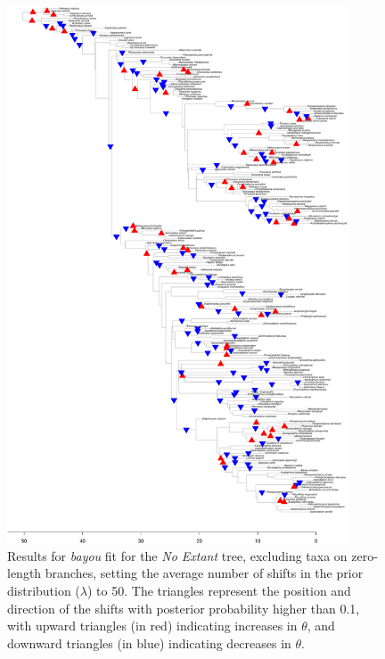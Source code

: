 \begin{figure}[H]
\includegraphics[width=0.9\textwidth]{img/plots-noextant-k50-1.pdf}
\caption{Results for \textit{bayou} fit for the \textit{No Extant} tree, excluding taxa on zero-length branches, setting the average number of shifts in the prior distribution ($\lambda$) to 50. The triangles represent the position and direction of the shifts with posterior probability higher than 0.1, with upward triangles (in red) indicating increases in $\theta$, and downward triangles (in blue) indicating decreases in $\theta$.}
\label{fig:extant-k50-nzlb}
\end{figure}

\newpage

